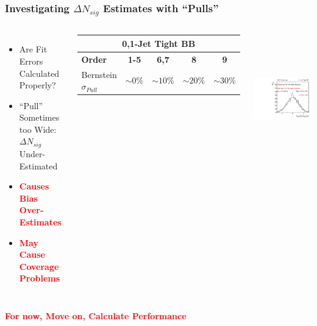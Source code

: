 \documentclass{beamer}
\newcommand{\tredbf}[1]{\textcolor{red}{\bf #1}}
\begin{document}
\begin{frame}
\frametitle{Investigating $\Delta N_{sig}$ Estimates with ``Pulls''}
\begin{columns}[c]
 \column{60mm}
  \small
  \begin{itemize}
    \item Are Fit Errors Calculated Properly?
    \item ``Pull'' Sometimes too Wide: \\$\Delta N_{sig}$ Under-Estimated
    \item \tredbf{Causes Bias Over-Estimates}
    \item \tredbf{May Cause Coverage Problems}
  \end{itemize}
  \begin{center}
    \tiny
    \begin{tabular}{|l|c|c|c|c|} \hline 
    \multicolumn{5}{|c|}{\bf 0,1-Jet Tight BB} \\ \hline
    \bf Order &  \bf 1-5 &\bf  6,7 &\bf  8 &\bf  9 \\ \hline
    Bernstein $\sigma_{Pull}$ & $\sim0\%$ & $\sim10\%$ & $\sim20\%$ & $\sim30\%$ \\ \hline
    \end{tabular}
  \end{center}
 \column{60mm}
    \begin{center}
      \includegraphics[height=55mm]{redoWholeRange/biasStudy/bias_Jets01PassPtG10BB_115_Z_RefBernstein_Alt6Bernstein.pdf}
    \end{center}
\end{columns}
\begin{center}
  \large
  \tredbf{
  For now, Move on, Calculate Performance
  }
\end{center}
\end{frame}
\end{document}
